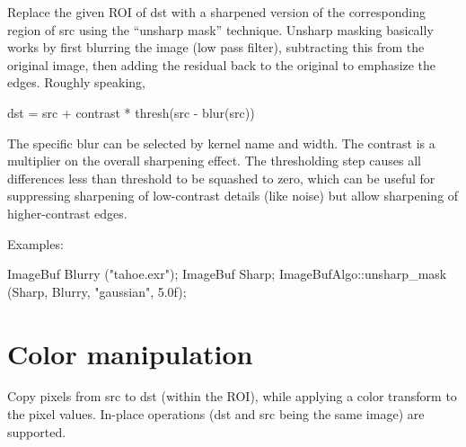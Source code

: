  

Replace the given ROI of {\cf dst} with a sharpened version of the
corresponding region of {\cf src} using the ``unsharp mask'' technique.
Unsharp masking basically works by first blurring the image (low
pass filter), subtracting this from the original image, then
adding the residual back to the original to emphasize the edges.
Roughly speaking,

\begin{code}
     dst = src + contrast * thresh(src - blur(src))
\end{code}

The specific blur can be selected by kernel name and width.  The
{\cf contrast} is a multiplier on the overall sharpening effect.  The
thresholding step causes all differences less than {\cf threshold} to be
squashed to zero, which can be useful for suppressing sharpening of
low-contrast details (like noise) but allow sharpening of
higher-contrast edges.

\smallskip
\noindent Examples:
\begin{code}
    ImageBuf Blurry ("tahoe.exr");
    ImageBuf Sharp;
    ImageBufAlgo::unsharp_mask (Sharp, Blurry, "gaussian", 5.0f);
\end{code}
\apiend


\section{Color manipulation}
\label{sec:iba:color}

 
Copy pixels from {\cf src} to {\cf dst} (within the ROI), while
applying a color transform to the pixel values.
In-place operations ({\cf dst} and {\cf src} being the same image)
are supported.

